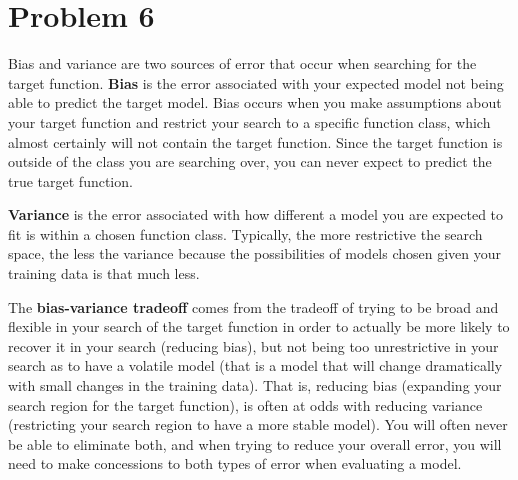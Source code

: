 \documentclass[11pt]{article}
\begin{document}
\section*{Problem 6}

\vspace{5 mm}
\noindent
Bias and variance are two sources of error that occur when searching for the 
target function. {\bf Bias} is the error associated with your expected model 
not being able to predict the target model. Bias occurs when you make 
assumptions about your target function and restrict your search to a specific 
function class, which almost certainly will not contain the target function. 
Since the target function is outside of the class you are searching over, you 
can never expect to predict the true target function.

\vspace{5 mm}
\noindent
{\bf Variance} is the error associated with how different a model you are 
expected to fit is within a chosen function class. Typically, the more 
restrictive the search space, the less the variance because the possibilities of 
models chosen given your training data is that much less.

\vspace{5 mm}
\noindent
The {\bf bias-variance tradeoff} comes from the tradeoff of trying to be broad 
and flexible in your search of the target function in order to actually be more 
likely to recover it in your search (reducing bias), but not being too 
unrestrictive in your search as to have a volatile model (that is a model that 
will change dramatically with small changes in the training data). That is, 
reducing bias (expanding your search region for the target function), is often 
at odds with reducing variance (restricting your search region to have a more 
stable model). You will often never be able to eliminate both, and when trying 
to reduce your overall error, you will need to make concessions to both types 
of error when evaluating a model.

\newpage
\begin{center}
\ \\
\end{center}
\end{document}
